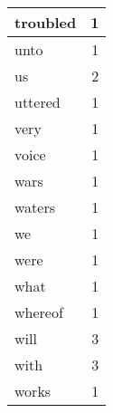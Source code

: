 \begin{center}
\begin{longtable}{l|r}
troubled & 1 \\ \hline
unto & 1 \\ \hline
us & 2 \\ \hline
uttered & 1 \\ \hline
very & 1 \\ \hline
voice & 1 \\ \hline
wars & 1 \\ \hline
waters & 1 \\ \hline
we & 1 \\ \hline
were & 1 \\ \hline
what & 1 \\ \hline
whereof & 1 \\ \hline
will & 3 \\ \hline
with & 3 \\ \hline
works & 1 \\ \hline
\end{longtable}
\end{center}



\normalsize



